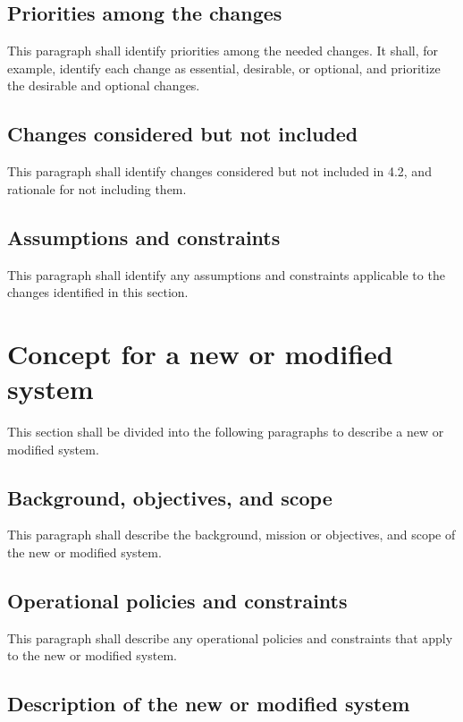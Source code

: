 \documentclass{fidata-report-template}
\begin{document}
\subsection{Priorities among the changes}

This paragraph shall identify priorities among the needed changes. It
shall, for example, identify each change as essential, desirable, or
optional, and prioritize the desirable and optional changes.

\subsection{Changes considered but not included}

This paragraph shall identify changes considered but not included in
4.2, and rationale for not including them.

\subsection{Assumptions and constraints}

This paragraph shall identify any assumptions and constraints applicable
to the changes identified in this section.

\section{Concept for a new or modified system}

This section shall be divided into the following paragraphs to describe
a new or modified system.

\subsection{Background, objectives, and scope}

This paragraph shall describe the background, mission or objectives, and
scope of the new or modified system.

\subsection{Operational policies and constraints}

This paragraph shall describe any operational policies and constraints
that apply to the new or modified system.

\subsection{Description of the new or modified system}
\end{document}
